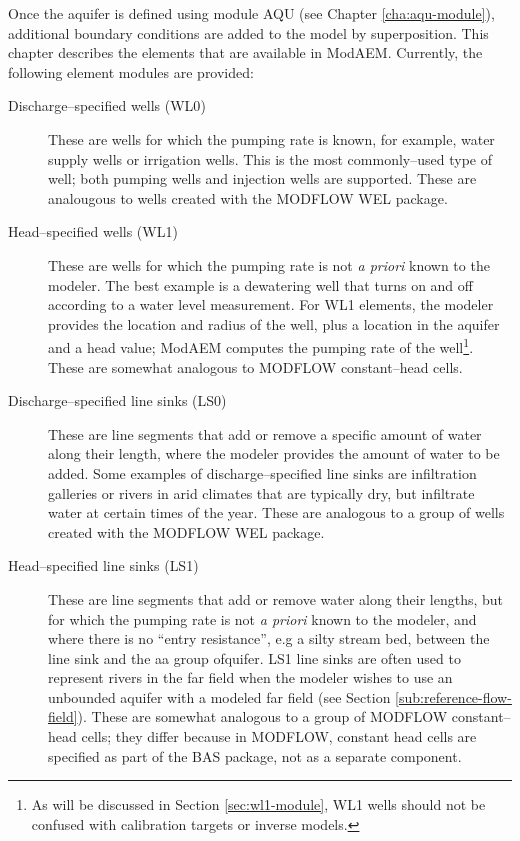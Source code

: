 Once the aquifer is defined using module \textsf{AQU} (see Chapter \ref{cha:aqu-module}), additional boundary conditions are added to the model by superposition. This chapter describes the elements that are available in ModAEM. Currently, the following element modules are provided:

\begin{description}
\item [{Discharge--specified wells (\textsf{WL0})}] These are wells for which the pumping rate is known, for example, water supply wells or irrigation wells. This is the most commonly--used type of well; both pumping wells and injection wells are supported. These are analougous to wells created with the MODFLOW WEL package.

\item [{Head--specified wells (\textsf{WL1})}] These are wells for which the pumping rate is not \emph{a priori} known to the modeler. The best example is a dewatering well that turns on and off according to a water level measurement. For WL1 elements, the modeler provides the location and radius of the well, plus a location in the aquifer and a head value; ModAEM computes the pumping rate of the well\footnote{As will be discussed in Section \ref{sec:wl1-module}, \textsf{WL1} wells should not be confused with calibration targets or inverse models.}. These are somewhat analogous to MODFLOW constant--head cells.

\item [{Discharge--specified line sinks (\textsf{LS0})}] These are line segments that add or remove a specific amount of water along their length, where the modeler provides the amount of water to be added. Some examples of discharge--specified line sinks are infiltration galleries or rivers in arid climates that are typically dry, but infiltrate water at certain times of the year. These are analogous to a group of wells created with the MODFLOW WEL package.

\item [{Head--specified line sinks (\textsf{LS1})}] These are line segments that add or remove water along their lengths, but for which the pumping rate is not \emph{a priori} known to the modeler, and where there
is no ``entry resistance'', e.g a silty stream bed, between the line sink and the aa group ofquifer. \textsf{LS1} line sinks are often used to represent rivers in the far field when the modeler wishes to use an unbounded aquifer with a modeled far field (see Section \ref{sub:reference-flow-field}). These are somewhat analogous to a group of MODFLOW constant--head cells; they differ because in MODFLOW, constant head cells are specified as part of the BAS package, not as a separate component.


\end{description}
